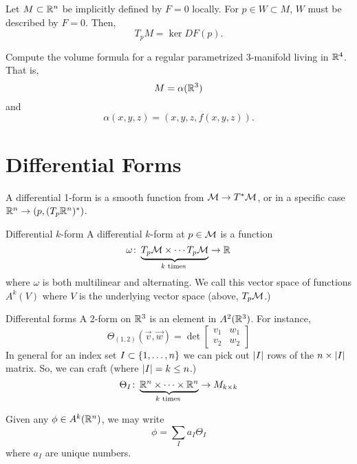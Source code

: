 \documentclass{article}
\begin{document}
\begin{theorem}{}{}
  Let $M \subset \RR[n]$ be implicitly defined by $F = 0$ locally.
  For $p \in W \subset M$, $W$ must be described by $F = 0$.
  Then,
  \[ T_{p}M = \ker DF(p). \]
\end{theorem}

\begin{example}{}{}
  Compute the volume formula for a regular parametrized 3-manifold living in $\RR[4]$. That is,
  \[ M = \alpha(\RR[3]) \]
  and
  \[ \alpha(x, y, z) = (x, y, z, f(x, y, z)). \]
\end{example}

\section{Differential Forms}

A differential 1-form is a smooth function from $\M \to T^{\ast}\M$, or in a specific case $\RR[n] \to (p, \pars{T_{p}\RR[n]}^{\ast})$.

\begin{definition}{Differential $k$-form}{}
  A differential $k$-form at $p \in \M$ is a function
  \[
    \omega \from \underbrace{T_{p}\M \times \cdots T_{p}\M}_{k \text{ times }} \to \RR
  \]
  where $\omega$ is both multilinear and alternating.
  We call this vector space of functions $A^{k}(V)$ where $V$ is the underlying vector space (above, $T_{p}\M$.)
\end{definition}

\begin{example}{Differental forms}{}
  A 2-form on $\RR[3]$ is an element in $A^{2}(\RR[3])$. For instance,
  \[ \Theta_{(1, 2)}(\vec{v}, \vec{w}) = \det \begin{bmatrix} v_{1} & w_{1} \\ v_{2} & w_{2} \end{bmatrix} \]
  In general for an index set $I \subset \set{1, \ldots, n}$ we can pick out $\abs{I}$ rows of the $n \times \abs{I}$ matrix.
  So, we can craft (where $\abs{I} = k \le n$.)
  \[ \Theta_{I} \from \underbrace{\RR[n] \times \cdots \times \RR[n]}_{k \text{ times }} \to M_{k \times k} \]
\end{example}

\begin{proposition}{}{}
  Given any $\phi \in A^{k}(\RR[n])$, we may write
  \[ \phi = \sum_{I} a_{I} \Theta_{I} \]
  where $a_{I}$ are unique numbers.
\end{proposition}
\end{document}
